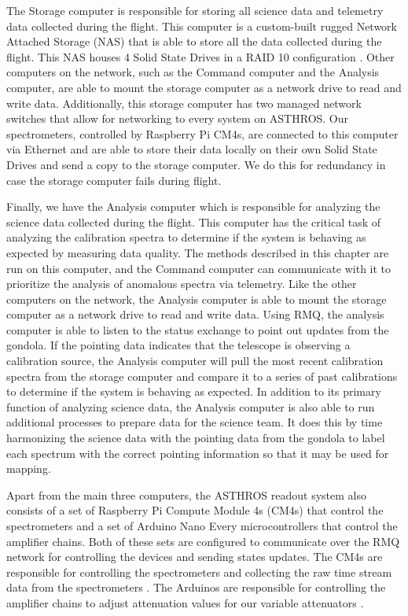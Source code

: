 The Storage computer is responsible for storing all science data and telemetry data collected during the flight.
This computer is a custom-built rugged Network Attached Storage (NAS) that is able to store all the data collected during the flight.
This NAS houses 4 Solid State Drives in a RAID 10 configuration \parencite{chen1994raid}.
Other computers on the network, such as the Command computer and the Analysis computer, are able to mount the storage computer as a network drive to read and write data.
Additionally, this storage computer has two managed network switches that allow for networking to every system on ASTHROS.
Our spectrometers, controlled by Raspberry Pi CM4s, are connected to this computer via Ethernet and are able to store their data locally on their own Solid State Drives and send a copy to the storage computer.
We do this for redundancy in case the storage computer fails during flight.

Finally, we have the Analysis computer which is responsible for analyzing the science data collected during the flight. 
This computer has the critical task of analyzing the calibration spectra to determine if the system is behaving as expected by measuring data quality. 
The methods described in this chapter are run on this computer, and the Command computer can communicate with it to prioritize the analysis of anomalous spectra via telemetry.
Like the other computers on the network, the Analysis computer is able to mount the storage computer as a network drive to read and write data.
Using RMQ, the analysis computer is able to listen to the status exchange to point out updates from the gondola.
If the pointing data indicates that the telescope is observing a calibration source, the Analysis computer will pull the most recent calibration spectra from the storage computer and compare it to a series of past calibrations to determine if the system is behaving as expected.
In addition to its primary function of analyzing science data, the Analysis computer is also able to run additional processes to prepare data for the science team. 
It does this by time harmonizing the science data with the pointing data from the gondola to label each spectrum with the correct pointing information so that it may be used for mapping. 

Apart from the main three computers, the ASTHROS readout system also consists of a set of Raspberry Pi Compute Module 4s (CM4s) that control the spectrometers and a set of Arduino Nano Every microcontrollers that control the amplifier chains. 
Both of these sets are configured to communicate over the RMQ network for controlling the devices and sending states updates.
The CM4s are responsible for controlling the spectrometers and collecting the raw time stream data from the spectrometers \parencite{mohammed2024digital}.
The Arduinos are responsible for controlling the amplifier chains to adjust attenuation values for our variable attenuators \parencite{Ricardo}.


